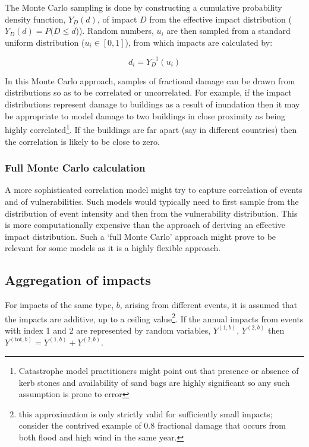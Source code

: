 \documentclass[a4paper,11pt]{extarticle} %
\begin{document}
{The Monte Carlo sampling is done by constructing a cumulative probability density function, $Y_D(d)$, of impact $D$ from the effective impact distribution ($Y_D(d) = P(D \le d$)). Random numbers, $u_i$ are then sampled from a standard uniform distribution ($u_i \in [0, 1]$), from which impacts are calculated by:

\begin{equation}
	\label{Eq:sampling}
	d_i = Y^{-1}_D(u_i)
\end{equation}   

In this Monte Carlo approach, samples of fractional damage can be drawn from distributions so as to be correlated or uncorrelated. For example, if the impact distributions represent damage to buildings as a result of inundation then it may be appropriate to model damage to two buildings in close proximity as being highly correlated\footnote{Catastrophe model practitioners might point out that presence or absence of kerb stones and availability of sand bags are highly significant so any such assumption is prone to error}. If the buildings are far apart (say in different countries) then the correlation is likely to be close to zero.

\subsubsection{Full Monte Carlo calculation}
A more sophisticated correlation model might try to capture correlation of events and of vulnerabilities. Such models would typically need to first sample from the distribution of event intensity and then from the vulnerability distribution. This is more computationally expensive than the approach of deriving an effective impact distribution. Such a `full Monte Carlo' approach might prove to be relevant for some models as it is a highly flexible approach. 
   

\subsection{Aggregation of impacts}
For impacts of the same type, $b$, arising from different events, it is assumed that the impacts are additive, up to a ceiling value\footnote{this approximation is only strictly valid for sufficiently small impacts; consider the contrived example of 0.8 fractional damage that occurs from both flood and high wind in the same year.}. If the annual impacts from events with index 1 and 2 are represented by random variables, $Y^{(1,b)}$, $Y^{(2,b)}$ then $Y^{(\text{tot}, b)} = Y^{(1,b)} + Y^{(2,b)}$. 

}
\end{document}
